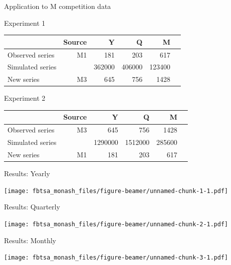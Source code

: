 \documentclass[14pt,ignorenonframetext,]{beamer}
\begin{document}
\begin{frame}{Application to M competition data}
\protect\hypertarget{application-to-m-competition-data}{}

\begin{block}{Experiment 1}
\centering\small\tabcolsep=0.1cm
\begin{tabular}{lrrrrr}
                 & Source & Y      & Q      & M \\
\midrule
Observed series  & M1     & 181    & 203    & 617 \\
Simulated series &        & 362000 & 406000 & 123400 \\
New series       & M3     & 645    & 756    & 1428
\end{tabular}
\end{block}
\begin{block}{Experiment 2}
\centering\small\tabcolsep=0.1cm
\begin{tabular}{lrrrrr}
                 & Source & Y       & Q       & M \\
\midrule
Observed series  & M3     & 645     & 756     & 1428 \\
Simulated series &        & 1290000 & 1512000 & 285600 \\
New series       & M1     & 181     & 203     & 617
\end{tabular}
\end{block}

\end{frame}

\begin{frame}{Results: Yearly}
\protect\hypertarget{results-yearly}{}

\texttt{[image: fbtsa\_monash\_files/figure-beamer/unnamed-chunk-1-1.pdf]}

\end{frame}

\begin{frame}{Results: Quarterly}
\protect\hypertarget{results-quarterly}{}

\texttt{[image: fbtsa\_monash\_files/figure-beamer/unnamed-chunk-2-1.pdf]}

\end{frame}

\begin{frame}{Results: Monthly}
\protect\hypertarget{results-monthly}{}

\texttt{[image: fbtsa\_monash\_files/figure-beamer/unnamed-chunk-3-1.pdf]}

\end{frame}
\end{document}
